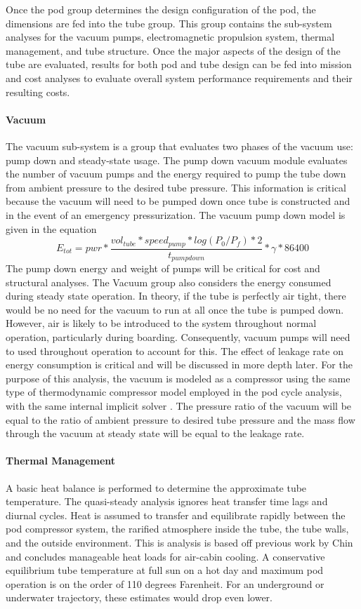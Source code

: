 	Once the pod group determines the design configuration of the pod, the
	dimensions are fed into the tube group. This group contains the sub-system
	analyses for the vacuum pumps, electromagnetic propulsion system, thermal
	management, and tube structure. Once the major aspects of the design of the
	tube are evaluated, results for both pod and tube design can be fed into
	mission and cost analyses to evaluate overall system performance
	requirements and their resulting costs.

\paragraph{Vacuum}
	The vacuum sub-system is a group that evaluates two phases of the vacuum
	use: pump down and steady-state usage. The pump down vacuum module
	evaluates the number of vacuum pumps and the energy required to pump the
	tube down from ambient pressure to the desired tube pressure.
	This information is critical because the vacuum will need to be pumped down
	once tube is constructed and in the event of an emergency pressurization.
	The vacuum pump down model is given in the equation
	\begin{equation}
		\label{eq:vacuum}
		E_{tot} = pwr * \frac{vol_{tube}*speed_{pump}*log(P_{0}/P_{f})*2}{t_{pumpdown}}* \gamma * 86400
	\end{equation}
	The pump down energy and weight of pumps will be critical for cost and structural analyses.
	The Vacuum group also considers the energy consumed during steady state operation.
	In theory, if the tube is perfectly air tight, there would be no need for
	the vacuum to run at all once the tube is pumped down. However, air is likely to be introduced
	to the system throughout normal operation, particularly during boarding. Consequently,
	vacuum pumps will need to used throughout operation to account for this.
	The effect of leakage rate on energy consumption is critical and will be
	discussed in more depth later. For the purpose of this analysis, the vacuum
	is modeled as a compressor using the same type of thermodynamic compressor
	model employed in the pod cycle analysis,
	with the same internal implicit solver \cite{pycycle2}.
	The pressure ratio of the vacuum will be equal to the ratio of ambient
	pressure to desired tube pressure and the mass flow through the vacuum at
	steady state will be equal to the leakage rate.
\paragraph{Thermal Management}
	A basic heat balance is performed to determine the approximate tube temperature.
	The quasi-steady analysis ignores heat transfer time lags and diurnal cycles.
	Heat is assumed to transfer and equilibrate rapidly between the pod compressor system,
	the rarified atmosphere inside the tube, the tube walls, and the outside environment.
	This is analysis is based off previous work by Chin\cite{Chin} and concludes
	manageable heat loads for air-cabin cooling. A conservative equilibrium
	tube temperature at full sun on a hot day and maximum pod operation is on
	the order of 110 degrees Farenheit.
	For an underground or underwater trajectory, these estimates would drop even lower.
